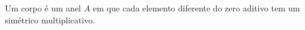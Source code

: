 \documentclass[../main.tex]{subfiles}
\begin{document}
\begin{defi}
    Um corpo é um anel $A$ em que cada elemento diferente do zero aditivo tem um simétrico multiplicativo.
\end{defi}

\end{document}
